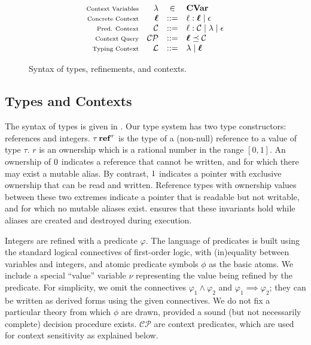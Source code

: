 \begin{figure}[t]
\begin{minipage}{0.59\textwidth}
\[\begin{array}{rrcl}
      \text{\scriptsize Context Variables} & \lambda & \in & \CVar \\
      \text{\scriptsize Concrete Context} & \oldvec{\ell} & ::= & \ell  \ottsym{:}  \oldvec{\ell} \mid  \epsilon  \\
      \text{\scriptsize Pred. Context} & \mathcal{C} & ::= &  \ell  :  \mathcal{C}  \mid \lambda \mid  \epsilon  \\
      \text{\scriptsize Context Query} & \mathcal{CP} & ::= &   \oldvec{\ell}     \preceq    \mathcal{C}  \\
      \text{\scriptsize Typing Context} & \mathcal{L} & ::= & \lambda \mid \oldvec{\ell} \\
    \end{array}
  \]
  \end{minipage}
  \caption{Syntax of types, refinements, and contexts.}
  \label{fig:types}
\end{figure}

\subsection{Types and Contexts}
\label{sec:types}
The syntax of types is given in .
Our type system has two type constructors: references and integers. $ \tau  \operatorname{\mathbf{ref}}^{ r } $ is the
type of a (non-null) reference to a value of type $\tau$.
$r$ is an ownership which is a rational number in the
range $[0,1]$. An ownership of $0$ indicates a
reference that cannot be written,
and for which there may exist a mutable alias.
By contrast, $1$ indicates a pointer with exclusive
ownership that can be read and written. Reference types with ownership values between
these two extremes indicate a pointer that is readable but not writable, and for which no mutable aliases exist.
\name ensures that these
invariants hold while aliases are created and destroyed during execution.

Integers are refined with a predicate $\varphi$.  The language of predicates is built using the
standard logical connectives of first-order logic,
with (in)equality between variables and integers, and atomic predicate symbols
$\phi$ as the basic atoms. We include a special
``value'' variable $\nu$ representing the
value being refined by the predicate. For simplicity, we omit the
connectives $ \varphi_{{\mathrm{1}}}  \wedge  \varphi_{{\mathrm{2}}} $ and $\varphi_{{\mathrm{1}}}  \implies  \varphi_{{\mathrm{2}}}$; they can be written
as derived forms using the given connectives.
We do not fix a particular theory from which $\phi$ are drawn, provided a sound
(but not necessarily complete) decision procedure exists.
$\mathcal{CP}$ are context predicates, which are used for context sensitivity as
explained below.

